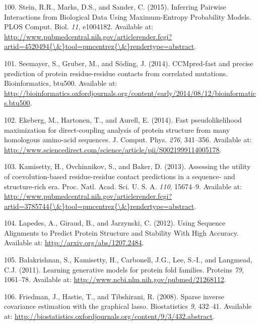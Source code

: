\documentclass[11pt,a4paper,twoside]{book}
\theoremstyle{definition}
\theoremstyle{definition}
\theoremstyle{remark}
\begin{document}
\hypertarget{ref-Stein2015a}{}
100. Stein, R.R., Marks, D.S., and Sander, C. (2015). Inferring Pairwise
Interactions from Biological Data Using Maximum-Entropy Probability
Models. PLOS Comput. Biol. \emph{11}, e1004182. Available at:
\href{http://www.pubmedcentral.nih.gov/articlerender.fcgi?artid=4520494\%7B/\&\%7Dtool=pmcentrez\%7B/\&\%7Drendertype=abstract}{http://www.pubmedcentral.nih.gov/articlerender.fcgi?artid=4520494\{\textbackslash{}\&\}tool=pmcentrez\{\textbackslash{}\&\}rendertype=abstract}.

\hypertarget{ref-Seemayer2014}{}
101. Seemayer, S., Gruber, M., and Söding, J. (2014). CCMpred-fast and
precise prediction of protein residue-residue contacts from correlated
mutations. Bioinformatics, btu500. Available at:
\url{http://bioinformatics.oxfordjournals.org/content/early/2014/08/12/bioinformatics.btu500}.

\hypertarget{ref-Ekeberg2014}{}
102. Ekeberg, M., Hartonen, T., and Aurell, E. (2014). Fast
pseudolikelihood maximization for direct-coupling analysis of protein
structure from many homologous amino-acid sequences. J. Comput. Phys.
\emph{276}, 341--356. Available at:
\url{http://www.sciencedirect.com/science/article/pii/S0021999114005178}.

\hypertarget{ref-Kamisetty2013}{}
103. Kamisetty, H., Ovchinnikov, S., and Baker, D. (2013). Assessing the
utility of coevolution-based residue-residue contact predictions in a
sequence- and structure-rich era. Proc. Natl. Acad. Sci. U. S. A.
\emph{110}, 15674--9. Available at:
\href{http://www.pubmedcentral.nih.gov/articlerender.fcgi?artid=3785744\%7B/\&\%7Dtool=pmcentrez\%7B/\&\%7Drendertype=abstract}{http://www.pubmedcentral.nih.gov/articlerender.fcgi?artid=3785744\{\textbackslash{}\&\}tool=pmcentrez\{\textbackslash{}\&\}rendertype=abstract}.

\hypertarget{ref-Lapedes2012a}{}
104. Lapedes, A., Giraud, B., and Jarzynski, C. (2012). Using Sequence
Alignments to Predict Protein Structure and Stability With High
Accuracy. Available at: \url{http://arxiv.org/abs/1207.2484}.

\hypertarget{ref-Balakrishnan2011}{}
105. Balakrishnan, S., Kamisetty, H., Carbonell, J.G., Lee, S.-I., and
Langmead, C.J. (2011). Learning generative models for protein fold
families. Proteins \emph{79}, 1061--78. Available at:
\url{http://www.ncbi.nlm.nih.gov/pubmed/21268112}.

\hypertarget{ref-Friedman2008}{}
106. Friedman, J., Hastie, T., and Tibshirani, R. (2008). Sparse inverse
covariance estimation with the graphical lasso. Biostatistics \emph{9},
432--41. Available at:
\url{http://biostatistics.oxfordjournals.org/content/9/3/432.abstract}.
\end{document}
